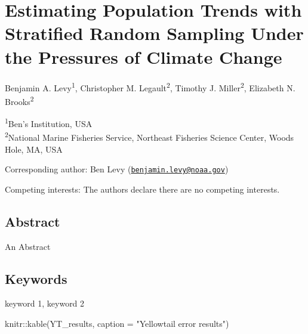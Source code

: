 \documentclass[
  12pt,
]{article}
\author{}
\date{\vspace{-2.5em}}
\newenvironment{Shaded}{\begin{snugshade}}{\end{snugshade}}
\newcommand{\AttributeTok}[1]{\textcolor[rgb]{0.77,0.63,0.00}{#1}}
\newcommand{\FunctionTok}[1]{\textcolor[rgb]{0.00,0.00,0.00}{#1}}
\newcommand{\NormalTok}[1]{#1}
\newcommand{\SpecialCharTok}[1]{\textcolor[rgb]{0.00,0.00,0.00}{#1}}
\newcommand{\StringTok}[1]{\textcolor[rgb]{0.31,0.60,0.02}{#1}}
\begin{document}
\newpage

\hypertarget{estimating-population-trends-with-stratified-random-sampling-under-the-pressures-of-climate-change}{%
\section{Estimating Population Trends with Stratified Random Sampling Under the Pressures of Climate Change}\label{estimating-population-trends-with-stratified-random-sampling-under-the-pressures-of-climate-change}}

Benjamin A. Levy\textsuperscript{1}, Christopher M. Legault\textsuperscript{2}, Timothy J. Miller\textsuperscript{2}, Elizabeth N. Brooks\textsuperscript{2}

\textsuperscript{1}Ben's Institution, USA\\
\textsuperscript{2}National Marine Fisheries Service, Northeast Fisheries Science Center, Woods Hole, MA, USA

Corresponding author: Ben Levy (\href{mailto:benjamin.levy@noaa.gov}{\nolinkurl{benjamin.levy@noaa.gov}})

Competing interests: The authors declare there are no competing interests.

\newpage

\hypertarget{abstract}{%
\subsection{Abstract}\label{abstract}}

An Abstract

\hypertarget{keywords}{%
\subsection{Keywords}\label{keywords}}

keyword 1, keyword 2

\newpage

\begin{Shaded}
\begin{Highlighting}[]
\NormalTok{knitr}\SpecialCharTok{::}\FunctionTok{kable}\NormalTok{(YT\_results, }\AttributeTok{caption =} \StringTok{"Yellowtail error results"}\NormalTok{)}
\end{Highlighting}
\end{Shaded}
\end{document}
